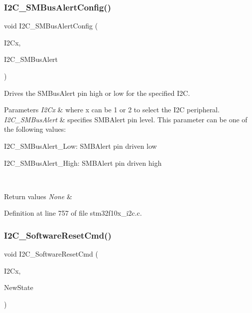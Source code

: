 \subsubsection{\texorpdfstring{I2\+C\+\_\+\+S\+M\+Bus\+Alert\+Config()}{I2C\_SMBusAlertConfig()}}
{\footnotesize\ttfamily void I2\+C\+\_\+\+S\+M\+Bus\+Alert\+Config (\begin{DoxyParamCaption}\item[{\hyperlink{struct_i2_c___type_def}{I2\+C\+\_\+\+Type\+Def} $\ast$}]{I2\+Cx,  }\item[{uint16\+\_\+t}]{I2\+C\+\_\+\+S\+M\+Bus\+Alert }\end{DoxyParamCaption})}



Drives the S\+M\+Bus\+Alert pin high or low for the specified I2C. 


\begin{DoxyParams}{Parameters}
{\em I2\+Cx} & where x can be 1 or 2 to select the I2C peripheral. \\
\hline
{\em I2\+C\+\_\+\+S\+M\+Bus\+Alert} & specifies S\+M\+B\+Alert pin level. This parameter can be one of the following values\+: \begin{DoxyItemize}
\item I2\+C\+\_\+\+S\+M\+Bus\+Alert\+\_\+\+Low\+: S\+M\+B\+Alert pin driven low \item I2\+C\+\_\+\+S\+M\+Bus\+Alert\+\_\+\+High\+: S\+M\+B\+Alert pin driven high \end{DoxyItemize}
\\
\hline
\end{DoxyParams}

\begin{DoxyRetVals}{Return values}
{\em None} & \\
\hline
\end{DoxyRetVals}


Definition at line 757 of file stm32f10x\+\_\+i2c.\+c.

\mbox{\label{group___i2_c___private___functions_ga1289c908aeb882443aba323b459c638b}} 
\subsubsection{\texorpdfstring{I2\+C\+\_\+\+Software\+Reset\+Cmd()}{I2C\_SoftwareResetCmd()}}
{\footnotesize\ttfamily void I2\+C\+\_\+\+Software\+Reset\+Cmd (\begin{DoxyParamCaption}\item[{\hyperlink{struct_i2_c___type_def}{I2\+C\+\_\+\+Type\+Def} $\ast$}]{I2\+Cx,  }\item[{\hyperlink{group___exported__types_gac9a7e9a35d2513ec15c3b537aaa4fba1}{Functional\+State}}]{New\+State }\end{DoxyParamCaption})}



